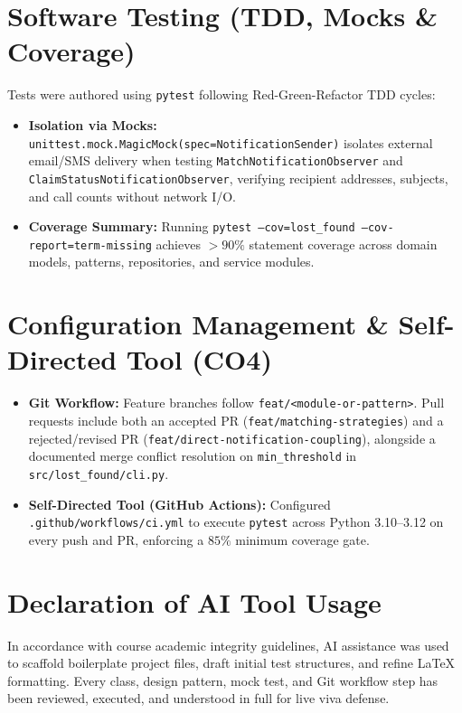 \documentclass[12pt,a4paper]{article}
\begin{document}
\section{Software Testing (TDD, Mocks \& Coverage)}
Tests were authored using \texttt{pytest} following Red-Green-Refactor TDD cycles:
\begin{itemize}
    \item \textbf{Isolation via Mocks:} \texttt{unittest.mock.MagicMock(spec=NotificationSender)} isolates external email/SMS delivery when testing \texttt{MatchNotificationObserver} and \texttt{ClaimStatusNotificationObserver}, verifying recipient addresses, subjects, and call counts without network I/O.
    \item \textbf{Coverage Summary:} Running \texttt{pytest --cov=lost\_found --cov-report=term-missing} achieves $>90\%$ statement coverage across domain models, patterns, repositories, and service modules.
\end{itemize}

\section{Configuration Management \& Self-Directed Tool (CO4)}
\begin{itemize}
    \item \textbf{Git Workflow:} Feature branches follow \texttt{feat/<module-or-pattern>}. Pull requests include both an accepted PR (\texttt{feat/matching-strategies}) and a rejected/revised PR (\texttt{feat/direct-notification-coupling}), alongside a documented merge conflict resolution on \texttt{min\_threshold} in \texttt{src/lost\_found/cli.py}.
    \item \textbf{Self-Directed Tool (GitHub Actions):} Configured \texttt{.github/workflows/ci.yml} to execute \texttt{pytest} across Python 3.10--3.12 on every push and PR, enforcing a $85\%$ minimum coverage gate.
\end{itemize}

\section{Declaration of AI Tool Usage}
In accordance with course academic integrity guidelines, AI assistance was used to scaffold boilerplate project files, draft initial test structures, and refine LaTeX formatting. Every class, design pattern, mock test, and Git workflow step has been reviewed, executed, and understood in full for live viva defense.
\end{document}
